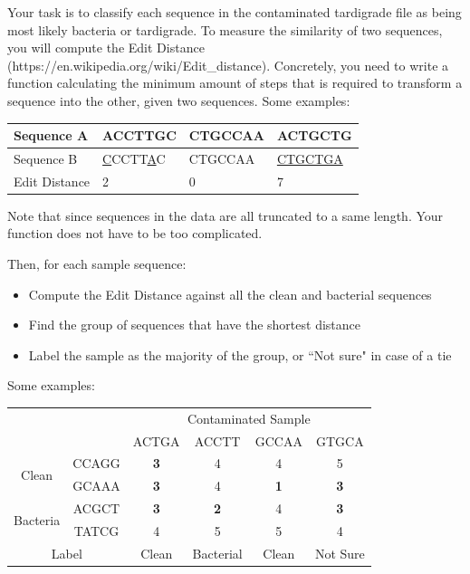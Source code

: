 \documentclass[11pt]{article}
\renewcommand\:{\colon} %
\begin{document}
Your task is to classify each sequence in the contaminated tardigrade file as being most likely bacteria or tardigrade.  To measure the similarity of two sequences, you will compute the Edit Distance (https://en.wikipedia.org/wiki/Edit\_distance). Concretely, you need to write a function calculating the minimum amount of steps that is required to transform a sequence into the other, given two sequences. Some examples:
\begin{table}[h]
\centering
\begin{tabular}{|l|l|l|l|}
\hline
Sequence A    & ACCTTGC & CTGCCAA & ACTGCTG \\ \hline
Sequence B    & \underline{C}CCTT\underline{A}C & CTGCCAA & \underline{CTGCTGA} \\ \hline
Edit Distance & 2       & 0       & 7       \\ \hline
\end{tabular}
\end{table}

Note that since sequences in the data are all truncated to a same length. Your function does not have to be too complicated.

Then, for each sample sequence:
\begin{itemize}
\item Compute the Edit Distance against all the clean and bacterial sequences
\item Find the group of sequences that have the shortest distance
\item Label the sample as the majority of the group, or ``Not sure" in case of a tie
\end{itemize}

Some examples:

\begin{table}[h]
\centering
\begin{tabular}{cc|c|c|c|c|}
\cline{3-6}
                                                &       & \multicolumn{4}{c|}{Contaminated Sample}          \\ \cline{3-6} 
                                                &       & ACTGA      & ACCTT      & GCCAA      & GTGCA      \\ \hline
\multicolumn{1}{|c|}{\multirow{2}{*}{Clean}}    & CCAGG & \textbf{3} & 4          & 4          & 5          \\ \cline{2-6} 
\multicolumn{1}{|c|}{}                          & GCAAA & \textbf{3} & 4          & \textbf{1} & \textbf{3} \\ \hline
\multicolumn{1}{|c|}{\multirow{2}{*}{Bacteria}} & ACGCT & \textbf{3} & \textbf{2} & 4          & \textbf{3} \\ \cline{2-6} 
\multicolumn{1}{|c|}{}                          & TATCG & 4          & 5          & 5          & 4          \\ \hline
\multicolumn{2}{|c|}{Label}                             & Clean      & Bacterial  & Clean      & Not Sure   \\ \hline
\end{tabular}
\end{table}
\end{document}

